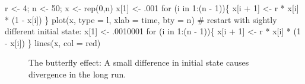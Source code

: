 \documentclass[
  a4paper,
  DIV=11,
  numbers=noendperiod,
  oneside]{scrreprt}
\newenvironment{Shaded}{}{}
\newcommand{\AttributeTok}[1]{\textcolor[rgb]{0.84,0.23,0.29}{#1}}
\newcommand{\CommentTok}[1]{\textcolor[rgb]{0.42,0.45,0.49}{#1}}
\newcommand{\ControlFlowTok}[1]{\textcolor[rgb]{0.84,0.23,0.29}{#1}}
\newcommand{\DecValTok}[1]{\textcolor[rgb]{0.00,0.36,0.77}{#1}}
\newcommand{\FunctionTok}[1]{\textcolor[rgb]{0.44,0.26,0.76}{#1}}
\newcommand{\NormalTok}[1]{\textcolor[rgb]{0.14,0.16,0.18}{#1}}
\newcommand{\OtherTok}[1]{\textcolor[rgb]{0.44,0.26,0.76}{#1}}
\newcommand{\SpecialCharTok}[1]{\textcolor[rgb]{0.00,0.36,0.77}{#1}}
\newcommand{\StringTok}[1]{\textcolor[rgb]{0.01,0.18,0.38}{#1}}
\begin{document}
\begin{Shaded}
\begin{Highlighting}[]
\NormalTok{r }\OtherTok{\textless{}{-}} \DecValTok{4}\NormalTok{;  n }\OtherTok{\textless{}{-}} \DecValTok{50}\NormalTok{; x }\OtherTok{\textless{}{-}} \FunctionTok{rep}\NormalTok{(}\DecValTok{0}\NormalTok{,n)}
\NormalTok{x[}\DecValTok{1}\NormalTok{] }\OtherTok{\textless{}{-}}\NormalTok{ .}\DecValTok{001}
\ControlFlowTok{for}\NormalTok{ (i }\ControlFlowTok{in} \DecValTok{1}\SpecialCharTok{:}\NormalTok{(n }\SpecialCharTok{{-}} \DecValTok{1}\NormalTok{))\{}
\NormalTok{  x[i }\SpecialCharTok{+} \DecValTok{1}\NormalTok{] }\OtherTok{\textless{}{-}}\NormalTok{ r }\SpecialCharTok{*}\NormalTok{ x[i] }\SpecialCharTok{*}\NormalTok{ (}\DecValTok{1} \SpecialCharTok{{-}}\NormalTok{ x[i])}
\NormalTok{\}}
\FunctionTok{plot}\NormalTok{(x, }\AttributeTok{type =} \StringTok{\textquotesingle{}l\textquotesingle{}}\NormalTok{, }\AttributeTok{xlab =} \StringTok{\textquotesingle{}time\textquotesingle{}}\NormalTok{, }\AttributeTok{bty =} \StringTok{\textquotesingle{}n\textquotesingle{}}\NormalTok{)}
\CommentTok{\# restart with sightly different initial state:}
\NormalTok{x[}\DecValTok{1}\NormalTok{] }\OtherTok{\textless{}{-}}\NormalTok{ .}\DecValTok{0010001}
\ControlFlowTok{for}\NormalTok{ (i }\ControlFlowTok{in} \DecValTok{1}\SpecialCharTok{:}\NormalTok{(n }\SpecialCharTok{{-}} \DecValTok{1}\NormalTok{))\{}
\NormalTok{  x[i }\SpecialCharTok{+} \DecValTok{1}\NormalTok{] }\OtherTok{\textless{}{-}}\NormalTok{ r }\SpecialCharTok{*}\NormalTok{ x[i] }\SpecialCharTok{*}\NormalTok{ (}\DecValTok{1} \SpecialCharTok{{-}}\NormalTok{ x[i])}
\NormalTok{\}}
\FunctionTok{lines}\NormalTok{(x, }\AttributeTok{col =} \StringTok{\textquotesingle{}red\textquotesingle{}}\NormalTok{)}
\end{Highlighting}
\end{Shaded}

\begin{figure}


\caption{\label{fig-ch2-img6}The butterfly effect: A small difference in
initial state causes divergence in the long run.}

\end{figure}%
\end{document}
